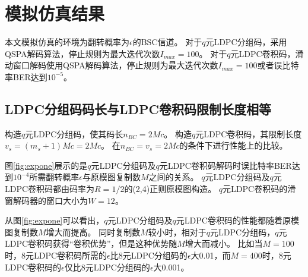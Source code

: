 \chapter{模拟仿真结果}
本文模拟仿真的环境为翻转概率为$\epsilon$的BSC信道。
对于$q$元LDPC分组码，采用QSPA解码算法，停止规则为最大迭代次数$I_{max}=100$。
对于$q$元LDPC卷积码，滑动窗口解码使用QSPA解码算法，停止规则为最大迭代次数$I_{max}=100$或者误比特率BER达到$10^{-5}$。
\section{LDPC分组码码长与LDPC卷积码限制长度相等}
构造$q$元LDPC分组码，使其码长$n_{BC}=2Mc$。
构造$q$元LDPC卷积码，其限制长度$v_s=(m_s+1)Mc=2Mc$。
在$n_{BC}=v_s=2Mc$的条件下进行性能上的比较。
\begin{center}
\pgfplotsset{compat=1.13}
\label{fig:expone}
\end{center}

图\ref{fig:expone}展示的是$q$元LDPC分组码及$q$元LDPC卷积码解码时误比特率BER达到$10^{-4}$所需翻转概率$\epsilon$与原模图复制数$M$之间的关系。
$q$元LDPC分组码及$q$元LDPC卷积码都由码率为$R=1/2$的(2,4)正则原模图构造。
$q$元LDPC卷积码的滑窗解码器的窗口大小为$W=12$。

从图\ref{fig:expone}可以看出，$q$元LDPC分组码及$q$元LDPC卷积码的性能都随着原模图复制数$M$增大而提高。
同时复制数$M$较小时，相对于$q$元LDPC分组码，$q$元LDPC卷积码获得“卷积优势”，但是这种优势随$M$增大而减小。
比如当$M=100$时，8元LDPC卷积码所需的$\epsilon$比8元LDPC分组码的$\epsilon$大0.01，而$M=400$时，8元LDPC卷积码的$\epsilon$仅比8元LDPC分组码的$\epsilon$大0.001。

